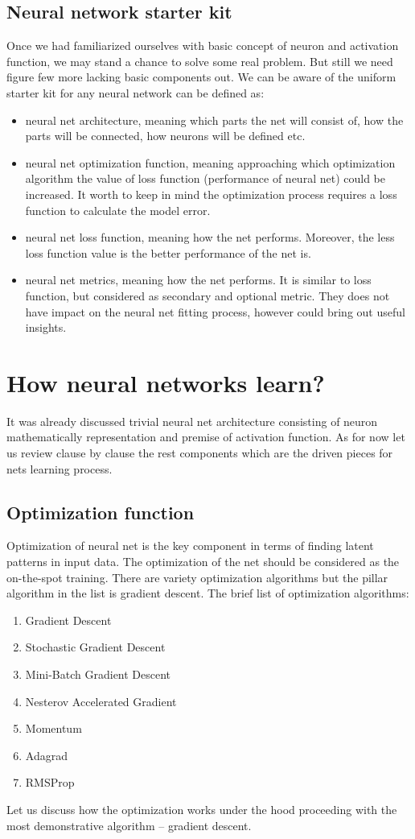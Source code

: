 \documentclass{article}
\begin{document}
\subsection{Neural network starter kit}
Once we had familiarized ourselves with basic concept of neuron and activation function, we may stand a chance to solve some real problem. But still we need figure few more lacking basic components out.
We can be aware of the uniform starter kit for any neural network can be defined as:
\begin{itemize}
    \item neural net architecture, meaning which parts the net will consist of, how the parts will be connected, how neurons will be defined etc.
    \item neural net optimization function, meaning approaching which optimization algorithm the value of loss function (performance of neural net) could be increased. It worth to keep in mind the optimization process requires a loss function to calculate the model error.
    \item neural net loss function, meaning how the net performs. Moreover, the less loss function value is the better performance of the net is.
    \item neural net metrics, meaning how the net performs. It is similar to loss function, but considered as secondary and optional metric. They does not have impact on the neural net fitting process, however could bring out useful insights.    
\end{itemize}


\section{How neural networks learn?}
It was already discussed trivial neural net architecture consisting of neuron mathematically representation and premise of activation function. As for now let us review clause by clause the rest components which are the driven pieces for nets learning process.

\subsection{Optimization function}
Optimization of neural net is the key component in terms of finding latent patterns in input data. The optimization of the net should be considered as the on-the-spot training. There are variety optimization algorithms but the pillar algorithm in the list is gradient descent.
The brief list of optimization algorithms:
\begin{enumerate}
    \item Gradient Descent
    \item Stochastic Gradient Descent
    \item Mini-Batch Gradient Descent
    \item Nesterov Accelerated Gradient
    \item Momentum
    \item Adagrad
    \item RMSProp
\end{enumerate}
Let us discuss how the optimization works under the hood proceeding with the most demonstrative algorithm -- gradient descent.
\end{document}
